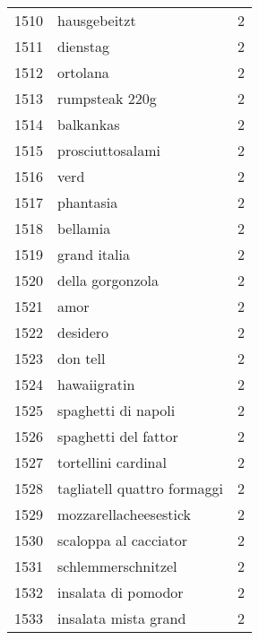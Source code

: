 \begin{tabular}{llr}
1510 &                                       hausgebeitzt &      2 \\
1511 &                                           dienstag &      2 \\
1512 &                                           ortolana &      2 \\
1513 &                                     rumpsteak 220g &      2 \\
1514 &                                          balkankas &      2 \\
1515 &                                   prosciuttosalami &      2 \\
1516 &                                               verd &      2 \\
1517 &                                          phantasia &      2 \\
1518 &                                           bellamia &      2 \\
1519 &                                       grand italia &      2 \\
1520 &                                   della gorgonzola &      2 \\
1521 &                                               amor &      2 \\
1522 &                                           desidero &      2 \\
1523 &                                           don tell &      2 \\
1524 &                                       hawaiigratin &      2 \\
1525 &                                spaghetti di napoli &      2 \\
1526 &                               spaghetti del fattor &      2 \\
1527 &                                tortellini cardinal &      2 \\
1528 &                        tagliatell quattro formaggi &      2 \\
1529 &                              mozzarellacheesestick &      2 \\
1530 &                              scaloppa al cacciator &      2 \\
1531 &                                 schlemmerschnitzel &      2 \\
1532 &                                insalata di pomodor &      2 \\
1533 &                               insalata mista grand &      2 \\

\end{tabular}
